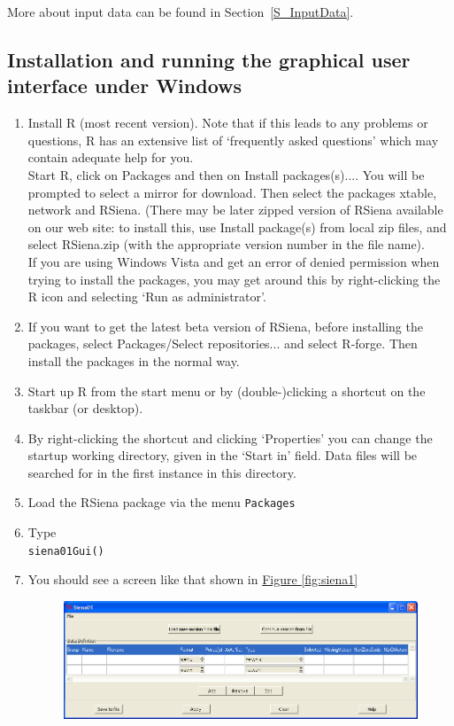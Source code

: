 \documentclass[a4paper,fleqn,11pt]{article}
\newcommand{\+}{\, + \,}
\newcommand{\sfn}[1]{\textsf{#1}}
\newcommand{\R}{{\sf R }}
\newcommand{\Rn}{{\sf R}}
\newcommand{\rs}{{\sf RSiena}}
\newcommand{\RS}{{\sf RSiena }}
\begin{document}
More about input data can be found in Section~\ref{S_InputData}.

\subsection{Installation and running the graphical user interface under Windows}
\label{Gui}
\begin{enumerate}
\item %
  Install \R (most recent version). Note that if this leads to any
  problems or questions, \R has an extensive list of `frequently asked
  questions' which may contain adequate help for you.\\
  Start \Rn, click on \sfn{Packages} and
  then on \sfn{Install packages(s)...}. You will be prompted to select a mirror
  for download. Then select the packages \sfn{xtable},
  \sfn{network}
  and \rs. (There may be later zipped version of \RS available on our web
  site: to install this, use \sfn{Install package(s) from local zip files}, and
  select \sfn{RSiena.zip} (with the appropriate version number in the file
  name).\\
  If you are using Windows Vista and get an error of denied permission
  when trying to install the packages,
  you may get around this by right-clicking the \R icon and selecting
  `Run as administrator'.
\item If you want to get the latest beta version of \rs, before installing the
  packages, select \sfn{Packages/Select repositories...} and select
  \sfn{R-forge}. Then install the packages in the normal way. \\
\item Start up \R from the start menu or by (double-)clicking a shortcut on
  the taskbar (or desktop).
\item By right-clicking the shortcut and clicking `Properties'
      you can change the startup working directory, given in the
      `Start in' field. Data files will be searched for in the first instance
      in this directory.
\item Load the \RS package via the menu \texttt{Packages}
\item Type\\
\verb|siena01Gui()|
\item You should see a screen like that shown in \hyperlink{siena1}{Figure
    \ref{fig:siena1}}
  \begin{figure}[ht]
    \begin{center}
      \includegraphics[width=\textwidth]{siena1.png}

\end{center}
\end{figure}
\end{enumerate}
\end{document}
